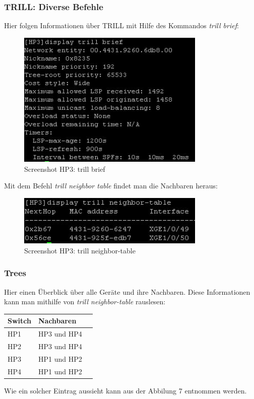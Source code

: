 \documentclass[a4,12pt]{scrartcl}
\begin{document}
\subsubsection{TRILL: Diverse Befehle}
Hier folgen Informationen über TRILL mit Hilfe des Kommandos \textit{trill brief}:
\begin{figure} [H]
	\begin{center}
	\includegraphics[width=0.80\textwidth]{./pictures/brief.jpg}
	\caption{Screenshot HP3: trill brief}
	\label{x}
	\end{center}
\end{figure}

Mit dem Befehl \textit{trill neighbor table} findet man die Nachbaren heraus: 
\begin{figure} [H]
	\begin{center}
	\includegraphics[width=0.80\textwidth]{./pictures/neighbor-table.jpg}
	\caption{Screenshot HP3: trill neighbor-table}
	\label{x}
	\end{center}
\end{figure}
\newpage

\subsubsection{Trees}
Hier einen Überblick über alle Geräte und ihre Nachbaren. Diese Informationen kann man mithilfe von \textit{trill neighbor-table} rauslesen: 
\begin{center}
    \begin{tabular}{@{} l l r@{}}\toprule    
    {Switch} & {Nachbaren}\\ \midrule
    HP1 & HP3 und HP4\\ \addlinespace
    HP2 & HP3 und HP4\\ \addlinespace
    HP3 & HP1 und HP2\\ \addlinespace
    HP4 & HP1 und HP2\\ 
    \bottomrule
    \end{tabular}
\end{center}
Wie ein solcher Eintrag aussieht kann aus der Abbilung 7 entnommen werden. 
\end{document}
